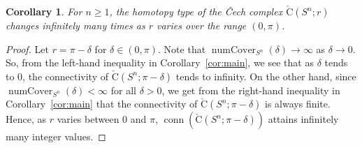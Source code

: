 \documentclass[10pt,a4paper]{amsart}
\newtheorem{corollary}{Corollary}
\newcommand{\cech}[2]{\mathrm{\check{C}}(#1;#2)}
\DeclareMathOperator{\conn}{conn}
\DeclareMathOperator{\numcov}{numCover}
\begin{document}
\begin{corollary}
For $n\ge 1$, the homotopy type of the \v{C}ech complex $\cech{S^n}{r}$ changes infinitely many times as $r$ varies over the range $(0,\pi)$.
\end{corollary}

\begin{proof}
Let $r=\pi-\delta$ for $\delta\in(0,\pi)$.
Note that $\numcov_{S^n}(\delta)\to\infty$ as $\delta\to 0$.
So, from the left-hand inequality in Corollary~\ref{cor:main}, we see that as $\delta$ tends to $0$, the connectivity of $\cech{S^n}{\pi-\delta}$ tends to infinity.
On the other hand, since $\numcov_{S^n}(\delta)<\infty$ for all $\delta>0$, we get from the right-hand inequality in Corollary~\ref{cor:main} that the connectivity of $\cech{S^n}{\pi-\delta}$ is always finite.
Hence, as $r$ varies between $0$ and $\pi$, $\conn(\cech{S^n}{\pi-\delta})$ attains infinitely many integer values.
\end{proof}
\end{document}
